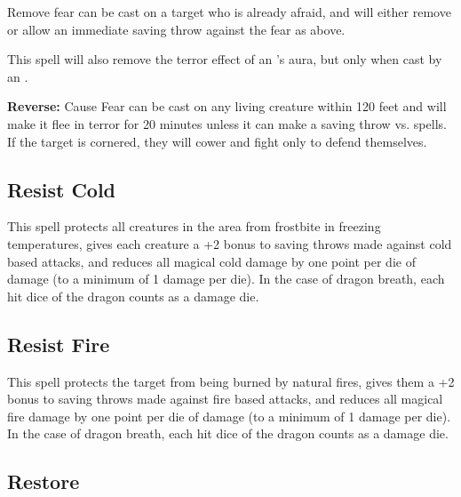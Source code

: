 \begin{multicols*}{2}
Remove fear can be cast on a target who is already afraid, and will either remove or allow an immediate saving throw against the fear as above.

This spell will also remove the terror effect of an ’s aura, but only when cast by an .

\textbf{Reverse:} \hypertarget{spell:Cause Fear}{Cause Fear} can be cast on any living creature within 120 feet and will make it flee in terror for 20 minutes unless it can make a saving throw vs. spells. If the target is cornered, they will cower and fight only to defend themselves.

\subsection{Resist Cold}\label{spell:Resist Cold}

This spell protects all creatures in the area from frostbite in freezing temperatures, gives each creature a +2 bonus to saving throws made against cold based attacks, and reduces all magical cold damage by one point per die of damage (to a minimum of 1 damage per die). In the case of dragon breath, each hit dice of the dragon counts as a damage die.

\subsection{Resist Fire}\label{spell:Resist Fire}

This spell protects the target from being burned by natural fires, gives them a +2 bonus to saving throws made against fire based attacks, and reduces all magical fire damage by one point per die of damage (to a minimum of 1 damage per die). In the case of dragon breath, each hit dice of the dragon counts as a damage die.

\subsection{Restore}\label{spell:Restore}
\end{multicols*}
